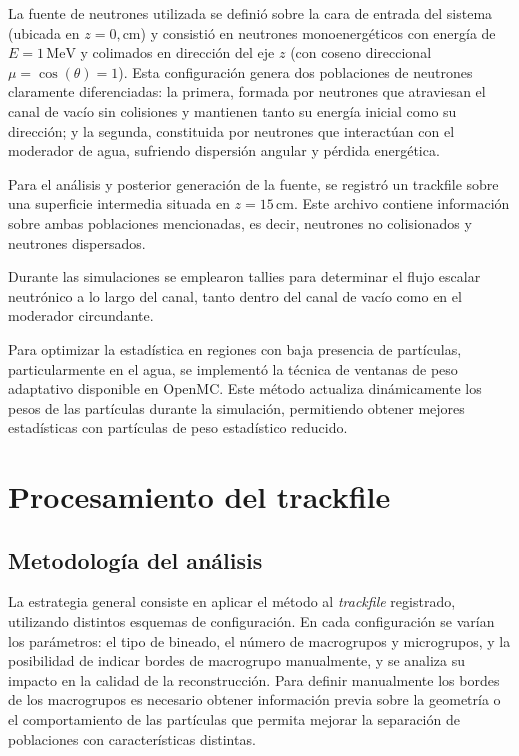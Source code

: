 La fuente de neutrones utilizada se definió sobre la cara de entrada del sistema (ubicada en $z = 0,\text{cm}$) y consistió en neutrones monoenergéticos con energía de $E = 1\,\text{MeV}$ y colimados en dirección del eje $z$ (con coseno direccional $\mu = \cos(\theta) = 1$). Esta configuración genera dos poblaciones de neutrones claramente diferenciadas: la primera, formada por neutrones que atraviesan el canal de vacío sin colisiones y mantienen tanto su energía inicial como su dirección; y la segunda, constituida por neutrones que interactúan con el moderador de agua, sufriendo dispersión angular y pérdida energética.

Para el análisis y posterior generación de la fuente, se registró un trackfile sobre una superficie intermedia situada en $z = 15\,\text{cm}$. Este archivo contiene información sobre ambas poblaciones mencionadas, es decir, neutrones no colisionados y neutrones dispersados.

Durante las simulaciones se emplearon tallies para determinar el flujo escalar neutrónico a lo largo del canal, tanto dentro del canal de vacío como en el moderador circundante.

Para optimizar la estadística en regiones con baja presencia de partículas, particularmente en el agua, se implementó la técnica de ventanas de peso adaptativo disponible en OpenMC. Este método actualiza dinámicamente los pesos de las partículas durante la simulación, permitiendo obtener mejores estadísticas con partículas de peso estadístico reducido.


\section{Procesamiento del trackfile}
\subsection{Metodología del análisis}
\label{sec:metodologia-analisis}


La estrategia general consiste en aplicar el método al \emph{trackfile} registrado, utilizando distintos esquemas de configuración. En cada configuración se varían los parámetros: el tipo de bineado, el número de macrogrupos y microgrupos, y la posibilidad de indicar bordes de macrogrupo manualmente, y se analiza su impacto en la calidad de la reconstrucción. Para definir manualmente los bordes de los macrogrupos es necesario obtener información previa sobre la geometría o el comportamiento de las partículas que permita mejorar la separación de poblaciones con características distintas.

